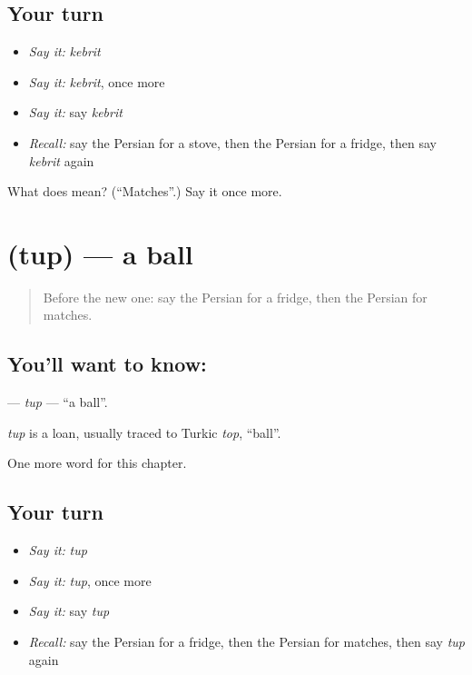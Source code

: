 \subsection*{Your turn}
\begin{itemize}
\raggedright
  \item \emph{Say it:} \emph{kebrit}
  \item \emph{Say it:} \emph{kebrit}, once more
  \item \emph{Say it:} say \emph{kebrit}
  \item \emph{Recall:} say the Persian for a stove, then the Persian for a fridge, then say \emph{kebrit} again
\end{itemize}

\begin{tcolorbox}[breakable,colback=teal!4,colframe=teal!35!black,title={Before you move on}]
What does  mean? (\textquotedblleft{}Matches\textquotedblright{}.) Say it once more.
\end{tcolorbox}
\section[\texorpdfstring{\fa{توپ} (tup)}{توپ (tup)}]{ (tup) — a ball}

\label{lesson:FA-C96-tup}



\begin{quote}
Before the new one: say the Persian for a fridge, then the Persian for matches.
\end{quote}

\subsection*{You'll want to know: }
\textbf{} — \emph{tup} — \textquotedblleft{}a ball\textquotedblright{}.

\begin{cousinweb}
\emph{tup} is a loan, usually traced to Turkic \emph{top}, \textquotedblleft{}ball\textquotedblright{}.
\end{cousinweb}

\begin{grammarlens}[title={What you've built}]
One more word for this chapter.
\end{grammarlens}

\subsection*{Your turn}
\begin{itemize}
\raggedright
  \item \emph{Say it:} \emph{tup}
  \item \emph{Say it:} \emph{tup}, once more
  \item \emph{Say it:} say \emph{tup}
  \item \emph{Recall:} say the Persian for a fridge, then the Persian for matches, then say \emph{tup} again
\end{itemize}

